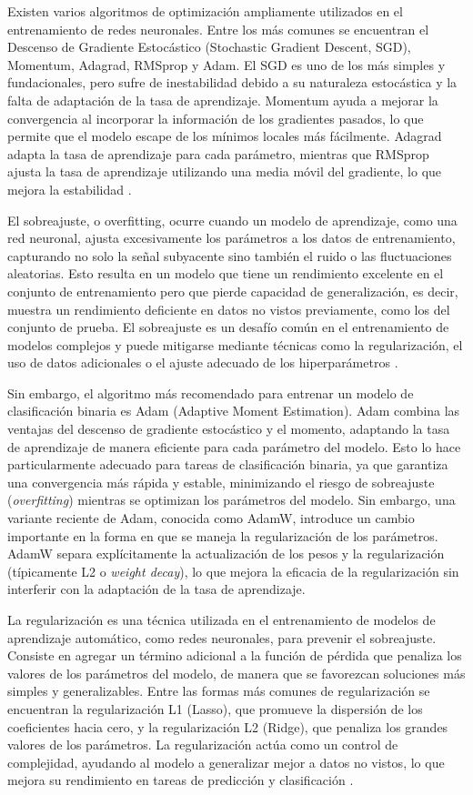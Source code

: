 Existen varios algoritmos de optimización ampliamente utilizados en el entrenamiento de redes neuronales. Entre los más comunes se encuentran el Descenso de Gradiente Estocástico (Stochastic Gradient Descent, SGD), Momentum, Adagrad, RMSprop y Adam. El SGD es uno de los más simples y fundacionales, pero sufre de inestabilidad debido a su naturaleza estocástica y la falta de adaptación de la tasa de aprendizaje. Momentum ayuda a mejorar la convergencia al incorporar la información de los gradientes pasados, lo que permite que el modelo escape de los mínimos locales más fácilmente. Adagrad adapta la tasa de aprendizaje para cada parámetro, mientras que RMSprop ajusta la tasa de aprendizaje utilizando una media móvil del gradiente, lo que mejora la estabilidad \cite{bottou2010large}.

El sobreajuste, o overfitting, ocurre cuando un modelo de aprendizaje, como una red neuronal, ajusta excesivamente los parámetros a los datos de entrenamiento, capturando no solo la señal subyacente sino también el ruido o las fluctuaciones aleatorias. Esto resulta en un modelo que tiene un rendimiento excelente en el conjunto de entrenamiento pero que pierde capacidad de generalización, es decir, muestra un rendimiento deficiente en datos no vistos previamente, como los del conjunto de prueba. El sobreajuste es un desafío común en el entrenamiento de modelos complejos y puede mitigarse mediante técnicas como la regularización, el uso de datos adicionales o el ajuste adecuado de los hiperparámetros \cite{bishop2006pattern}.

Sin embargo, el algoritmo más recomendado para entrenar un modelo de clasificación binaria es Adam (Adaptive Moment Estimation). Adam combina las ventajas del descenso de gradiente estocástico y el momento, adaptando la tasa de aprendizaje de manera eficiente para cada parámetro del modelo. Esto lo hace particularmente adecuado para tareas de clasificación binaria, ya que garantiza una convergencia más rápida y estable, minimizando el riesgo de sobreajuste (\textit{overfitting}) mientras se optimizan los parámetros del modelo. Sin embargo, una variante reciente de Adam, conocida como AdamW, introduce un cambio importante en la forma en que se maneja la regularización de los parámetros. AdamW separa explícitamente la actualización de los pesos y la regularización (típicamente L2 o \textit{weight decay}), lo que mejora la eficacia de la regularización sin interferir con la adaptación de la tasa de aprendizaje.

La regularización es una técnica utilizada en el entrenamiento de modelos de aprendizaje automático, como redes neuronales, para prevenir el sobreajuste. Consiste en agregar un término adicional a la función de pérdida que penaliza los valores de los parámetros del modelo, de manera que se favorezcan soluciones más simples y generalizables. Entre las formas más comunes de regularización se encuentran la regularización L1 (Lasso), que promueve la dispersión de los coeficientes hacia cero, y la regularización L2 (Ridge), que penaliza los grandes valores de los parámetros. La regularización actúa como un control de complejidad, ayudando al modelo a generalizar mejor a datos no vistos, lo que mejora su rendimiento en tareas de predicción y clasificación \cite{bishop2006pattern}.

